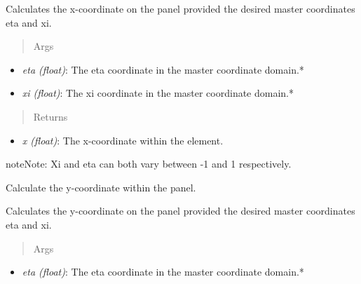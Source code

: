 \documentclass[letterpaper,10pt,english]{sphinxmanual}
\begin{document}
\begin{fulllineitems}
\begin{fulllineitems}
Calculates the x-coordinate on the panel provided the desired master
coordinates eta and xi.
\begin{quote}\begin{description}
\item[{Args}] \leavevmode
\end{description}\end{quote}
\begin{itemize}
\item {} 
\emph{eta (float)}: The eta coordinate in the master coordinate domain.*

\item {} 
\emph{xi (float)}: The xi coordinate in the master coordinate domain.*

\end{itemize}
\begin{quote}\begin{description}
\item[{Returns}] \leavevmode
\end{description}\end{quote}
\begin{itemize}
\item {} 
\emph{x (float)}: The x-coordinate within the element.

\end{itemize}

\begin{notice}{note}{Note:}
Xi and eta can both vary between -1 and 1 respectively.
\end{notice}

\end{fulllineitems}


\begin{fulllineitems}
\label{aerodynamics:AeroComBAT.Aerodynamics.CQUADA.y}
Calculate the y-coordinate within the panel.

Calculates the y-coordinate on the panel provided the desired master
coordinates eta and xi.
\begin{quote}\begin{description}
\item[{Args}] \leavevmode
\end{description}\end{quote}
\begin{itemize}
\item {} 
\emph{eta (float)}: The eta coordinate in the master coordinate domain.*


\end{itemize}
\end{fulllineitems}
\end{fulllineitems}
\end{document}
